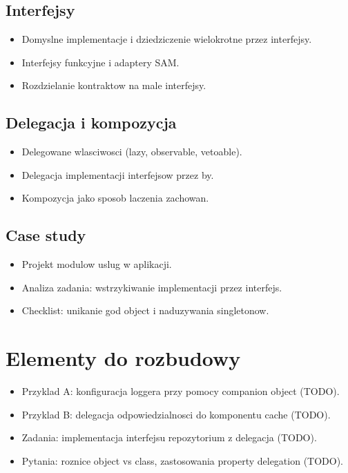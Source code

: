 \subsection{Interfejsy}
\begin{itemize}
  \item Domyslne implementacje i dziedziczenie wielokrotne przez interfejsy.
  \item Interfejsy funkcyjne i adaptery SAM.
  \item Rozdzielanie kontraktow na male interfejsy.
\end{itemize}

\subsection{Delegacja i kompozycja}
\begin{itemize}
  \item Delegowane wlasciwosci (lazy, observable, vetoable).
  \item Delegacja implementacji interfejsow przez by.
  \item Kompozycja jako sposob laczenia zachowan.
\end{itemize}

\subsection{Case study}
\begin{itemize}
  \item Projekt modulow uslug w aplikacji.
  \item Analiza zadania: wstrzykiwanie implementacji przez interfejs.
  \item Checklist: unikanie god object i naduzywania singletonow.
\end{itemize}

\section{Elementy do rozbudowy}
\begin{itemize}
  \item Przyklad A: konfiguracja loggera przy pomocy companion object (TODO).
  \item Przyklad B: delegacja odpowiedzialnosci do komponentu cache (TODO).
  \item Zadania: implementacja interfejsu repozytorium z delegacja (TODO).
  \item Pytania: roznice object vs class, zastosowania property delegation (TODO).
\end{itemize}


